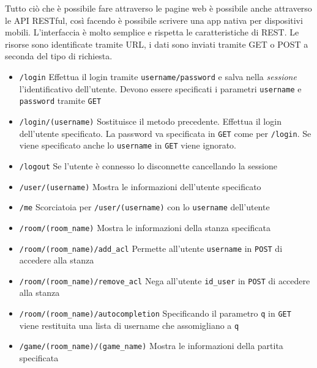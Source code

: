 Tutto ciò che è possibile fare attraverso le pagine web è possibile anche attraverso le API RESTful, così facendo è possibile scrivere una app nativa per dispositivi mobili. L'interfaccia è molto semplice e rispetta le caratteristiche di REST. Le risorse sono identificate tramite URL, i dati sono inviati tramite GET o POST a seconda del tipo di richiesta.

\begin{itemize}
	\item \texttt{/login} Effettua il login tramite \texttt{username/password} e salva nella \emph{sessione} l'identificativo dell'utente. Devono essere specificati i parametri \texttt{username} e \texttt{password} tramite \texttt{GET}
	
	\item \texttt{/login/(username)} Sostituisce il metodo precedente. Effettua il login dell'utente specificato. La password va specificata in \texttt{GET} come per \texttt{/login}. Se viene specificato anche lo \texttt{username} in \texttt{GET} viene ignorato.
	
	\item \texttt{/logout} Se l'utente è connesso lo disconnette cancellando la sessione
	
	\item \texttt{/user/(username)} Mostra le informazioni dell'utente specificato
	
	\item \texttt{/me} Scorciatoia per \texttt{/user/(username)} con lo \texttt{username} dell'utente 
	
	\item \texttt{/room/(room\_name)} Mostra le informazioni della stanza specificata
	
	\item \texttt{/room/(room\_name)/add\_acl} Permette all'utente \texttt{username} in \texttt{POST} di accedere alla stanza
	
	\item \texttt{/room/(room\_name)/remove\_acl} Nega all'utente \texttt{id\_user} in \texttt{POST} di accedere alla stanza
	
	\item \texttt{/room/(room\_name)/autocompletion} Specificando il parametro \texttt{q} in \texttt{GET} viene restituita una lista di username che assomigliano a \texttt{q}
	
	\item \texttt{/game/(room\_name)/(game\_name)} Mostra le informazioni della partita specificata
	

\end{itemize}
